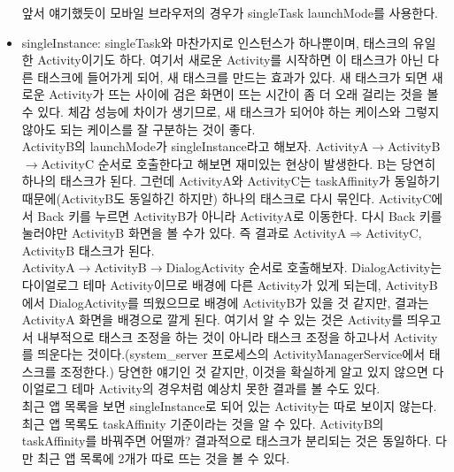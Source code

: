 \begin{itemize}
앞서 얘기했듯이 모바일 브라우저의 경우가 singleTask launchMode를 사용한다. 

\item singleInstance: singleTask와 마찬가지로 인스턴스가 하나뿐이며, 태스크의 유일한 Activity이기도 하다. 여기서 새로운 Activity를 시작하면 이 태스크가 아닌 다른 태스크에 들어가게 되어, 새 태스크를 만드는 효과가 있다. 새 태스크가 되면 새로운 Activity가 뜨는 사이에 검은 화면이 뜨는 시간이 좀 더 오래 걸리는 것을 볼 수 있다. 체감 성능에 차이가 생기므로, 새 태스크가 되어야 하는 케이스와 그렇지 않아도 되는 케이스를 잘 구분하는 것이 좋다.\\

ActivityB의 launchMode가 singleInstance라고 해보자. ActivityA$\rightarrow$ActivityB$\rightarrow$ActivityC 순서로 호출한다고 해보면 재미있는 현상이 발생한다. B는 당연히 하나의 태스크가 된다. 그런데 ActivityA와 ActivityC는 taskAffinity가 동일하기 때문에(ActivityB도 동일하긴 하지만) 하나의 태스크로 다시 묶인다. ActivityC에서 Back 키를 누르면 ActivityB가 아니라 ActivityA로 이동한다. 다시 Back 키를 눌러야만 ActivityB 화면을 볼 수가 있다. 즉 결과로 ActivityA$\Rightarrow$ActivityC, ActivityB 태스크가 된다.\\

ActivityA$\rightarrow$ActivityB$\rightarrow$DialogActivity 순서로 호출해보자. 
DialogActivity는 다이얼로그 테마 Activity이므로 배경에 다른 Activity가 있게 되는데, ActivityB에서 DialogActivity를 띄웠으므로 배경에 ActivityB가 있을 것 같지만, 결과는 ActivityA 화면을 배경으로 깔게 된다.
여기서 알 수 있는 것은 Activity를 띄우고서 내부적으로 태스크 조정을 하는 것이 아니라 태스크 조정을 하고나서 Activity를 띄운다는 것이다.(system\_server 프로세스의 ActivityManagerService에서 태스크를 조정한다.) 당연한 얘기인 것 같지만, 이것을 확실하게 알고 있지 않으면 다이얼로그 테마 Activity의 경우처럼 예상치 못한 결과를 볼 수도 있다.\\

최근 앱 목록을 보면 singleInstance로 되어 있는 Activity는 따로 보이지 않는다. 최근 앱 목록도 taskAffinity 기준이라는 것을 알 수 있다.
ActivityB의 taskAffinity를 바꿔주면 어떨까? 결과적으로 태스크가 분리되는 것은 동일하다. 다만 최근 앱 목록에 2개가 따로 뜨는 것을 볼 수 있다.
\end{itemize}
